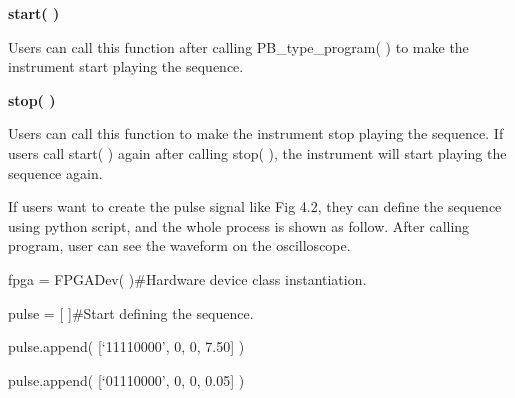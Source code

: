 \noindent\fontsize{12pt}{\baselineskip}\textbf{start( )}

\hspace{-0.2cm}Users can call this function after calling PB\_type\_program( ) to make the instrument start playing the sequence.
\vspace{0.4cm}

\noindent\fontsize{12pt}{\baselineskip}\textbf{stop( )}

\hspace{-0.2cm}Users can call this function to make the instrument stop playing the sequence. If users call start( ) again after calling stop( ), the instrument will start playing the sequence again.
\vspace{0.4cm}

\noindent\fontsize{12pt}{\baselineskip}\textbf{}

\hspace{-0.2cm}If users want to create the pulse signal like Fig 4.2, they can define the sequence using python script, and the whole process is shown as follow. After calling program, user can see the waveform on the oscilloscope.

fpga = FPGADev( )\qquad          \#Hardware device class instantiation.

pulse = [{ }{ }]\qquad            \#Start defining the sequence.

%
%
%
%
%
%
%
%
%

pulse.append({ }[`11110000', { }0, { }0, { }7.50]{ })

pulse.append({ }[`01110000', { }0, { }0, { }0.05]{ })

